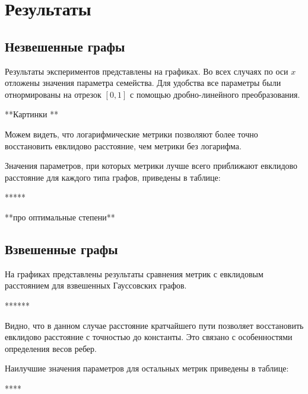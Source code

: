 \chapter{Результаты} \label{chapt3}


\section{Незвешенные графы} \label{sect3_1}

Результаты экспериментов представлены на графиках.
Во всех случаях по оси $x$ отложены значения параметра семейства. Для удобства все параметры были отнормированы на отрезок $[0,1]$ с помощью дробно-линейного преобразования.

**Картинки ** 

Можем видеть, что логарифмические метрики позволяют более точно восстановить евклидово расстояние, чем метрики без логарифма.

Значения параметров, при которых метрики лучше всего приближают евклидово расстояние для каждого типа графов, приведены в таблице:

*****

**про оптимальные степени**




\section{Взвешенные графы} \label{sect3_2}

На графиках представлены результаты сравнения метрик с евклидовым расстоянием для взвешенных Гауссовских графов.

******

Видно, что в данном случае расстояние кратчайшего пути позволяет восстановить евклидово расстояние с точностью до константы. Это связано с особенностями определения весов ребер.

Наилучшие значения параметров для остальных метрик приведены в таблице:

****



\clearpage